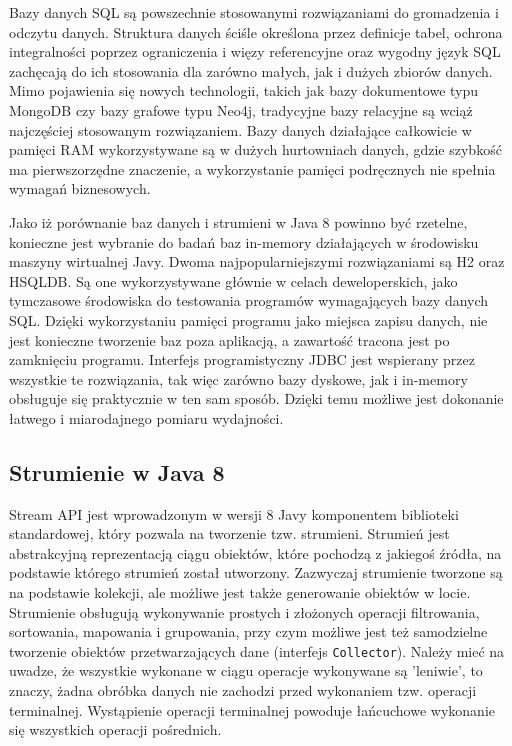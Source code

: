 \documentclass[12pt]{extarticle}
\begin{document}
    Bazy danych SQL są powszechnie stosowanymi rozwiązaniami do gromadzenia i odczytu danych. Struktura danych ściśle określona przez definicje tabel, ochrona integralności poprzez ograniczenia i więzy referencyjne oraz wygodny język SQL zachęcają do ich stosowania dla zarówno małych, jak i dużych zbiorów danych. Mimo pojawienia się nowych technologii, takich jak bazy dokumentowe typu MongoDB czy bazy grafowe typu Neo4j, tradycyjne bazy relacyjne są wciąż najczęściej stosowanym rozwiązaniem. Bazy danych działające całkowicie w pamięci RAM wykorzystywane są w dużych hurtowniach danych, gdzie szybkość ma pierwszorzędne znaczenie, a wykorzystanie pamięci podręcznych nie spełnia wymagań biznesowych.

    Jako iż porównanie baz danych i strumieni w Java 8 powinno być rzetelne, konieczne jest wybranie do badań baz in-memory działających w środowisku maszyny wirtualnej Javy. Dwoma najpopularniejszymi rozwiązaniami są H2 oraz HSQLDB. Są one wykorzystywane głównie w celach deweloperskich, jako tymczasowe środowiska do testowania programów wymagających bazy danych SQL. Dzięki wykorzystaniu pamięci programu jako miejsca zapisu danych, nie jest konieczne tworzenie baz poza aplikacją, a zawartość tracona jest po zamknięciu programu. Interfejs programistyczny JDBC jest wspierany przez wszystkie te rozwiązania, tak więc zarówno bazy dyskowe, jak i in-memory obsługuje się praktycznie w ten sam sposób. Dzięki temu możliwe jest dokonanie łatwego i miarodajnego pomiaru wydajności.

\subsection{Strumienie w Java 8}

    Stream API jest wprowadzonym w wersji 8 Javy komponentem biblioteki standardowej, który pozwala na tworzenie tzw. strumieni. Strumień jest abstrakcyjną reprezentacją ciągu obiektów, które pochodzą z jakiegoś źródła, na podstawie którego strumień został utworzony. Zazwyczaj strumienie tworzone są na podstawie kolekcji, ale możliwe jest także generowanie obiektów w locie. Strumienie obsługują wykonywanie prostych i złożonych operacji filtrowania, sortowania, mapowania i grupowania, przy czym możliwe jest też samodzielne tworzenie obiektów przetwarzających dane (interfejs \texttt{Collector}). Należy mieć na uwadze, że wszystkie wykonane w ciągu operacje wykonywane są 'leniwie', to znaczy, żadna obróbka danych nie zachodzi przed wykonaniem tzw. operacji terminalnej. Wystąpienie operacji terminalnej powoduje łańcuchowe wykonanie się wszystkich operacji pośrednich.
\end{document}
